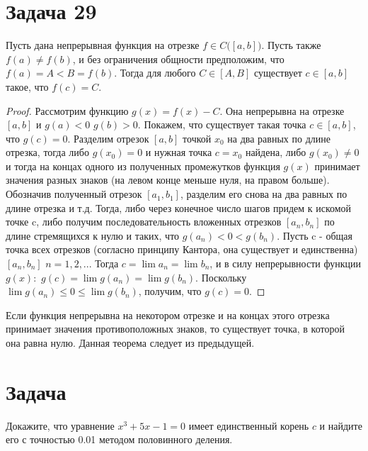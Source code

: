 \section*{Задача 29}
\begin{ther}
Пусть дана непрерывная функция на отрезке
$f\in C{\bigl (}[a,b]{\bigr )}$. Пусть также $f(a)\neq f(b)$,
и без ограничения общности предположим, что $f(a)=A<B=f(b)$.
Тогда для любого $C\in [A,B]$ существует $c\in [a,b]$ такое, что $f(c)=C$.
\end{ther}
\begin{proof}
	Рассмотрим функцию ${\displaystyle g(x)=f(x)-C.}$ Она непрерывна на отрезке
	${\displaystyle [a,b]}$  и ${\displaystyle g(a)<0}$  ${\displaystyle g(b)>0.}$
	Покажем, что существует такая точка $c\in [a,b]$, что ${\displaystyle g(c)=0.}$
	Разделим отрезок $[a,b]$ точкой $x_{0}$ на два равных по длине
	отрезка, тогда либо ${\displaystyle g(x_{0})=0}$ и нужная
	точка ${\displaystyle c=x_{0}}$ найдена, либо $g(x_{0})\neq 0$
	и тогда на концах одного из полученных промежутков функция $g(x)$
	принимает значения разных знаков (на левом конце меньше нуля, на правом больше).
	Обозначив полученный отрезок $[a_{1},b_{1}]$, разделим
	его снова на два равных по длине отрезка и т.д. Тогда, либо через конечное число
	шагов придем к искомой точке c, либо получим последовательность
	вложенных отрезков ${\displaystyle [a_{n},b_{n}]}$ по
	длине стремящихся к нулю и таких, что
	${\displaystyle g(a_{n})<0<g(b_{n}).}$
	Пусть c - общая точка всех отрезков (согласно принципу Кантора, она существует и единственна)
	 ${\displaystyle [a_{n},b_{n}]} $
	  ${\displaystyle n=1,2,...}$ Тогда
		$c=\lim a_{n}=\lim b_{n}$, и в силу непрерывности функции ${\displaystyle g(x):}$
 $g(c)=\lim g(a_{n})=\lim g(b_{n})$.
	Поскольку
$\lim g(a_{n})\leq 0\leq \lim g(b_{n})$,
	получим, что ${\displaystyle g(c)=0.}$
\end{proof}
\begin{ther}
Если функция непрерывна на некотором отрезке и на концах этого отрезка принимает
значения противоположных знаков, то существует точка, в которой она равна нулю.
Данная теорема следует из предыдущей.
\end{ther}
\section*{Задача}
Докажите, что уравнение $x^{3} + 5x - 1 = 0$ имеет единственный корень $c$ и
найдите его с точностью 0.01 методом половинного деления.
